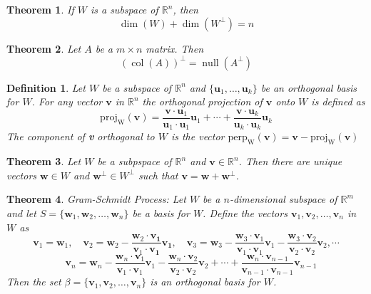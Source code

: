 \documentclass{article}
\theoremstyle{definitionstyle}
\newtheorem{definition}{Definition}[section]
\newtheorem{theorem}{Theorem}[section]
\newcommand{\vct}{\mathbf}
\begin{document}
\begin{theorem}
    If $W$ is a subspace of $\mathbb{R}^n$, then
    \begin{equation*}
        \dim(W)+\dim(W^\perp)=n
    \end{equation*}
\end{theorem}

\begin{theorem}
    Let $A$ be a $m \times n$ matrix. Then
    \begin{equation*}
        {(\operatorname*{col}(A))}^\perp=\operatorname*{null}(A^\perp)
    \end{equation*}
\end{theorem}

\begin{definition}
    Let $W$ be a subspace of $\mathbb{R}^n$ and $\{\vct{u}_1, \dots,\vct{u}_k\}$ be an orthogonal basis for $W$. For any
    vector $\vct v$ in $\mathbb{R}^n$ the orthogonal projection of $\vct v$ onto $W$ is defined as
    \begin{equation*}
        \operatorname*{{proj}_W} {(\vct v)} = \frac{\vct v \cdot \vct{u}_1}{\vct{u}_1 \cdot \vct{u}_1}\vct{u}_1+\cdots+\frac{\vct v \cdot \vct{u}_k}{\vct{u}_k \cdot \vct{u}_k}\vct{u}_k
    \end{equation*}
    The \textit{component} of \textbf{v} \textit{orthogonal} to $W$ is the vector $\operatorname*{{perp}_W}{(\vct v)}=\vct v - \operatorname*{{proj}_W} {(\vct v)}$
\end{definition}

\begin{theorem}
    Let $W$ be a subpspace of $\mathbb{R}^n$ and $\vct v \in \mathbb{R}^n$. Then there are unique vectors $\vct w \in W$ and
    $\vct{w}^\perp \in W^\perp$ such that $\vct v = \vct w + \vct{w}^\perp$.
\end{theorem}

\begin{theorem}
    \textit{Gram-Schmidt Process:} Let $W$ be a $n$-dimensional subspace of $\mathbb{R}^m$ and let $S=\{\vct{w}_1,\vct{w}_2,\dots,\vct{w}_n\}$ be a basis for $W$.
    Define the vectors $\vct{v}_1,\vct{v}_2,\dots,\vct{v}_n$ in $W$ as
    \begin{equation*}
        \vct{v}_1=\vct{w}_1, \quad \vct{v}_2=\vct{w}_2-\frac{\vct{w}_2 \cdot \vct{v_1}}{\vct{v}_1 \cdot \vct{v_1}}\vct{v_1}, \quad \vct{v}_3=\vct{w}_3-\frac{\vct{w}_3 \cdot \vct{v}_1}{\vct{v}_1 \cdot \vct{v}_1}\vct{v}_1-\frac{\vct{w}_3 \cdot \vct{v}_2}{\vct{v}_2 \cdot \vct{v}_2}\vct{v}_2, \cdots
    \end{equation*}
    \begin{equation*}
        \quad \vct{v}_n=\vct{w}_n-\frac{\vct{w}_n \cdot \vct{v}_1}{\vct{v}_1 \cdot \vct{v}_1}\vct{v}_1-\frac{\vct{w}_n \cdot \vct{v}_2}{\vct{v}_2 \cdot \vct{v}_2}\vct{v}_2 + \cdots + \frac{\vct{w}_n \cdot \vct{v}_{n-1}}{\vct{v}_{n-1} \cdot \vct{v}_{n-1}}\vct{v}_{n-1}
    \end{equation*}
    Then the set $\beta=\{\vct{v}_1,\vct{v}_2,\dots,\vct{v}_n\}$ is an \textit{orthogonal basis} for $W$.
\end{theorem}
\end{document}
